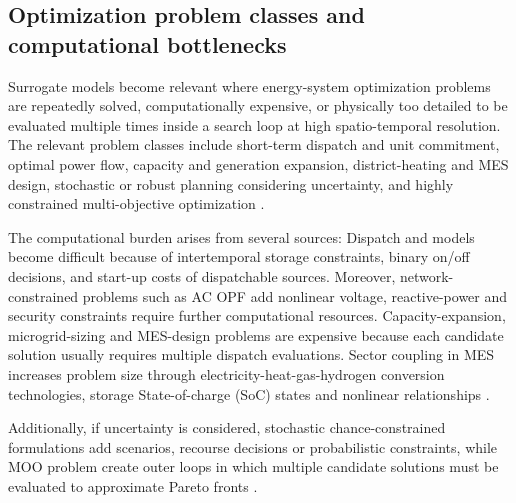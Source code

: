 \subsection{Optimization problem classes and computational bottlenecks}
\label{sec:optimization-bottlenecks}

Surrogate models become relevant where energy-system optimization
problems are repeatedly solved, computationally expensive, or physically
too detailed to be evaluated multiple times inside a search loop at high
spatio-temporal resolution. The relevant problem classes include
short-term dispatch and unit commitment, optimal power flow, capacity
and generation expansion, district-heating and MES design, stochastic or
robust planning considering uncertainty, and highly constrained
multi-objective optimization
\cite{Wu2022231,Chen20244723,Chen2022,Muhlpfordt20194806,Deng2020831,Khaloie2025,Rodgers2018951,Han2018622,Hirvonen2017323,Zhou20181}.

The computational burden arises from several sources: Dispatch and
models become difficult because of intertemporal storage constraints,
binary on/off decisions, and start-up costs of dispatchable sources.
Moreover, network-constrained problems such as AC OPF add nonlinear
voltage, reactive-power and security constraints require further
computational resources. Capacity-expansion, microgrid-sizing and
MES-design problems are expensive because each candidate solution
usually requires multiple dispatch evaluations. Sector coupling in MES
increases problem size through electricity-heat-gas-hydrogen conversion
technologies, storage State-of-charge (SoC) states and nonlinear
relationships
\cite{Safta20172535,Pang2023,Su2022315,Chen2023657,Koirala20242284,Zheng20231907,Ren2024,Jalving2023,Dong2023,Yin2024}.

Additionally, if uncertainty is considered, stochastic
chance-constrained formulations add scenarios, recourse decisions or
probabilistic constraints, while MOO problem create outer loops in which
multiple candidate solutions must be evaluated to approximate Pareto
fronts
\cite{Hu2020,Hu2021671,Volodina2022,Liang20246508,Thrampoulidis2021,Hussien20211883,Schulte2020,Han2018622}.
